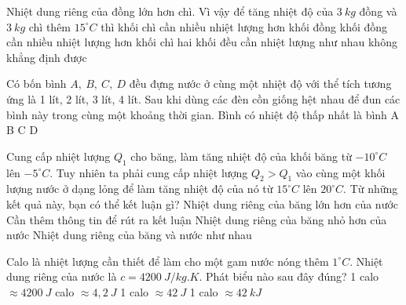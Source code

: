 \begin{ex}
	Nhiệt dung riêng của đồng lớn hơn chì. Vì vậy để tăng nhiệt độ của $3 \ kg$ đồng và $3 \ kg$ chì thêm $15^\circ C$ thì
	\choice
	{khối chì cần nhiều nhiệt lượng hơn khối đồng}
	{\True khối đồng cần nhiều nhiệt lượng hơn khối chì}
	{hai khối đều cần nhiệt lượng như nhau}
	{không khẳng định được}
	\end{ex}
\begin{ex}
	Có bốn bình $A,\ B,\ C,\ D$ đều đựng nước ở cùng một nhiệt độ với thể tích tương ứng là 1 lít, 2 lít, 3 lít, 4 lít. Sau khi dùng các đèn cồn giống hệt nhau để đun các bình này trong cùng một khoảng thời gian. Bình có nhiệt độ thấp nhất là bình
	\choice
	{A}
	{B}
	{C}
	{\True D}
	\end{ex}
\begin{ex} 
	Cung cấp nhiệt lượng $Q_1$ cho băng, làm tăng nhiệt độ của khối băng từ $-10^\circ C$ lên $-5^\circ C$. Tuy nhiên ta phải cung cấp nhiệt lượng $Q_2>Q_1$ vào cùng một khối lượng nước ở dạng lỏng để làm tăng nhiệt độ của nó từ $15^\circ C$ lên $20^\circ C$. Từ những kết quả này, bạn có thể kết luận gì?
	\choice 
	{Nhiệt dung riêng của băng lớn hơn của nước} 
	{Cần thêm thông tin để rút ra kết luận}
	{\True Nhiệt dung riêng của băng nhỏ hơn của nước} 
	{Nhiệt dung riêng của băng và nước như nhau}
\end{ex}
\begin{ex}
	Calo là nhiệt lượng cần thiết để làm cho một gam nước nóng thêm $1^\circ C$. Nhiệt dung riêng của nước là $c= 4200\ J/kg.K$. Phát biểu nào sau đây đúng?
	\choice
	{1 calo $\approx 4200 \ J$}
	{ calo $\approx 4,2 \ J$}
	{1 calo $\approx 42 \ J$}
	{1 calo $\approx 42 \ kJ$}
	\end{ex}
